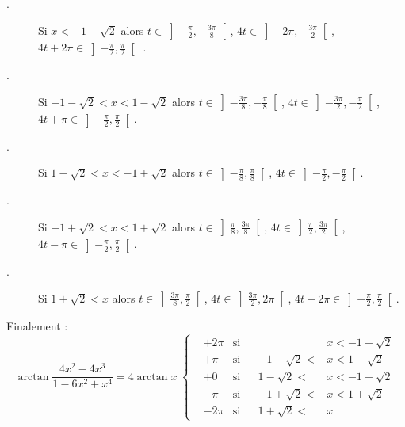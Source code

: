 \begin{enumerate}
\begin{enumerate}
\begin{description}
  \item[.] Si $x<-1 - \sqrt{2}$ alors $t\in \left] -\frac{\pi}{2},-\frac{3\pi }{8}\right[$, 
  $4t\in \left] -2\pi ,-\frac{3\pi}{2}\right[$, $4t+2\pi \in \left] -\frac{\pi }{2},\frac{\pi}{2}\right[$ .
  \item[.] Si $-1 - \sqrt{2}<x< 1 - \sqrt{2}$ alors $t\in \left] -\frac{3\pi }{8},-\frac{\pi }{8}\right[$,
  $4t\in \left] -\frac{3\pi }{2},-\frac{\pi }{2}\right[ $, $4t+\pi \in \left] -\frac{\pi }{2}, \frac{\pi }{2}\right[$.
  \item[.]  Si $1-\sqrt{2}<x<-1+\sqrt{2}$ alors $t\in \left]-\frac{\pi }{8},\frac{\pi }{8}\right[$,
  $4t\in \left] - \frac{\pi}{2},-\frac{\pi }{2}\right[$.
  \item[.] Si $-1 + \sqrt{2 } < x <1+\sqrt{2}$ alors $t\in \left] \frac{\pi }{8},\frac{3\pi }{8}\right[$,
  $4t\in \left]\frac{\pi }{2},\frac{3\pi }{2}\right[ $, $4t-\pi \in \left] -\frac{\pi }{2},\frac{\pi }{2}\right[$.
  \item[.] Si $1+\sqrt{2} < x$ alors $t\in \left] \frac{3\pi }{8},\frac{\pi }{2}\right[$,
  $4t\in \left] \frac{3\pi }{2},2\pi \right[ $, $4t-2\pi \in \left] -\frac{\pi }{2},\frac{\pi }{2}\right[$.
\end{description}
Finalement :
\[
\arctan \frac{4x^{2}-4x^{3}}{1-6x^{2}+x^{4}} = 4\arctan x \;
\left\{
\begin{aligned}
&+2\pi  &\text{si} & & &x < -1 - \sqrt{2}  \\
&+\pi   &\text{si} & &-1 - \sqrt{2} < &x < 1 - \sqrt{2}  \\
&+0     &\text{si} & &1 - \sqrt{2} < &x < -1 + \sqrt{2}  \\
&-\pi   &\text{si} & &-1 + \sqrt{2} < &x < 1 + \sqrt{2} \\
&-2\pi  &\text{si} & &1 + \sqrt{2} < &x 
\end{aligned}
\right.
\]
\end{enumerate}
\end{enumerate}

